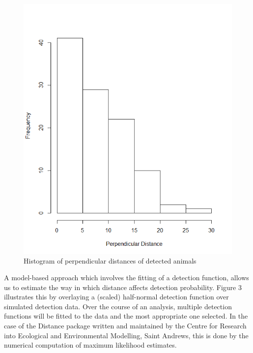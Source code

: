 \documentclass[11pt]{article}
\begin{document}
\begin{multicols}{2}
\begin{figure}[H]
\includegraphics[scale=0.5]{DistanceHist}
\caption{Histogram of perpendicular distances of detected animals}
\end{figure}

A model-based approach which involves the fitting of a detection function, allows us to estimate the way in which distance affects detection probability. Figure 3 illustrates this by overlaying a (scaled) half-normal detection function over simulated detection data. Over the course of an analysis, multiple detection functions will be fitted to the data and the most appropriate one selected. In the case of the Distance package written and maintained by the Centre for Research into Ecological and Environmental Modelling, Saint Andrews, this is done by the numerical computation of maximum likelihood estimates.


\end{multicols}
\end{document}
